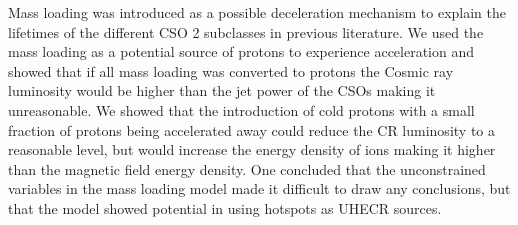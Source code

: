 Mass loading was introduced as a possible deceleration mechanism to explain the lifetimes of the different CSO 2 subclasses in previous literature. We used the mass loading as a potential source of protons to experience acceleration and showed that if all mass loading was converted to protons the Cosmic ray luminosity would be higher than the jet power of the CSOs making it unreasonable. We showed that the introduction of cold protons with a small fraction of protons being accelerated away could reduce the CR luminosity to a reasonable level, but would increase the energy density of ions making it higher than the magnetic field energy density. One concluded that the unconstrained variables in the mass loading model made it difficult to draw any conclusions, but that the model showed potential in using hotspots as UHECR sources.